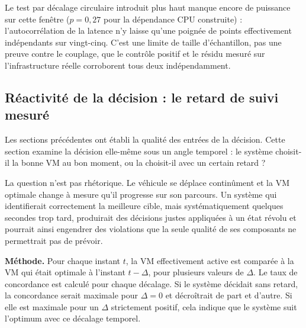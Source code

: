 Le test par décalage circulaire introduit plus haut manque encore de puissance sur cette fenêtre ($p=0{,}27$ pour la dépendance CPU construite) : l'autocorrélation de la latence n'y laisse qu'une poignée de points effectivement indépendants sur vingt-cinq. C'est une limite de taille d'échantillon, pas une preuve contre le couplage, que le contrôle positif et le résidu mesuré sur l'infrastructure réelle corroborent tous deux indépendamment.

\subsection{Réactivité de la décision : le retard de suivi mesuré}
\label{sec:retard-suivi}

Les sections précédentes ont établi la qualité des entrées de la décision. Cette section examine la décision elle-même sous un angle temporel : le système choisit-il la bonne VM au bon moment, ou la choisit-il avec un certain retard ?

La question n'est pas rhétorique. Le véhicule se déplace continûment et la VM optimale change à mesure qu'il progresse sur son parcours. Un système qui identifierait correctement la meilleure cible, mais systématiquement quelques secondes trop tard, produirait des décisions justes appliquées à un état révolu et pourrait ainsi engendrer des violations que la seule qualité de ses composants ne permettrait pas de prévoir.

\textbf{Méthode.} Pour chaque instant $t$, la VM effectivement active est comparée à la VM qui était optimale à l'instant $t - \Delta$, pour plusieurs valeurs de $\Delta$. Le taux de concordance est calculé pour chaque décalage. Si le système décidait sans retard, la concordance serait maximale pour $\Delta = 0$ et décroîtrait de part et d'autre. Si elle est maximale pour un $\Delta$ strictement positif, cela indique que le système suit l'optimum avec ce décalage temporel.

